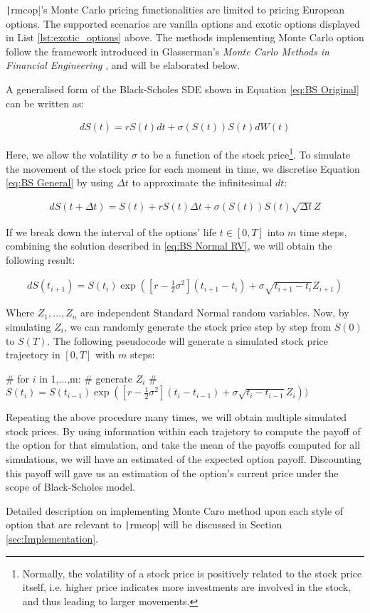 \texttt|rmcop|'s Monte Carlo pricing functionalities are limited to pricing European options. The supported scenarios are vanilla options and exotic options displayed in List \ref{lst:exotic_options} above. The methods implementing Monte Carlo option follow the framework introduced in Glasserman's \textit{Monte Carlo Methods in Financial Engineering} \cite{Glasserman2003}, and will be elaborated below.

A generalised form of the Black-Scholes SDE shown in Equation \ref{eq:BS Original} can be written as:

\begin{align} \label{eq:BS General}
dS(t) = rS(t)dt + \sigma(S(t))S(t)dW(t)
\end{align}

Here, we allow the volatility $\sigma$ to be a function of the stock price\footnote{Normally, the volatility of a stock price is positively related to the stock price itself, i.e. higher price indicates more investments are involved in the stock, and thus leading to larger movements.}. To simulate the movement of the stock price for each moment in time, we discretise Equation \ref{eq:BS General} by using $\Delta t$ to approximate the infinitesimal $dt$:

\begin{align}
dS(t + \Delta t) = S(t) + rS(t)\Delta t + \sigma(S(t))S(t)\sqrt{\Delta t}Z
\end{align}

If we break down the interval of the options' life $t\in[0,T]$ into $m$ time steps, combining the solution described in \ref{eq:BS Normal RV}, we will obtain the following result:

\begin{align} \label{eq:BS for MC}
dS(t_{i+1}) = S(t_i)\exp{([r - \frac{1}{2}\sigma^2](t_{i+1}-t_i) + \sigma\sqrt{t_{i+1} - t_i}Z_{i+1})}
\end{align}

Where $Z_1,...,Z_n$ are independent Standard Normal random variables. Now, by simulating $Z_i$, we can randomly generate the stock price step by step from $S(0)$ to $S(T)$. The following pseudocode will generate a simulated stock price trajectory in $[0,T]$ with $m$ steps:

\begin{Rminted}
# for $i$ in 1,...,m:
#	generate $Z_{i}$
#	$S(t_i) = S(t_{i-1})\exp{([r - \frac{1}{2}\sigma^2](t_{i}-t_{i-1}) + \sigma\sqrt{t_{i}-t_{i-1}}Z_{i}))}$
\end{Rminted}

Repeating the above procedure many times, we will obtain multiple simulated stock prices. By using information within each trajetory to compute the payoff of the option for that simulation, and take the mean of the payoffs computed for all simulations, we will have an estimated of the expected option payoff. Discounting this payoff will gave us an estimation of the option's current price under the scope of Black-Scholes model.

Detailed description on implementing Monte Caro method upon each style of option that are relevant to \texttt|rmcop| will be discussed in Section \ref{sec:Implementation}.

\newpage